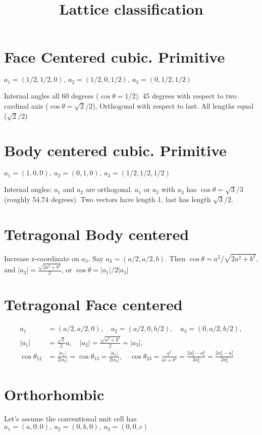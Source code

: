 \documentclass[a4paper,10pt]{article} 	%
\title{Lattice classification}
\author{}
\date{}
\numberwithin{equation}{section}
\begin{document}
	\maketitle

	\section{Face Centered cubic. Primitive}
	$a_1 = (1/2, 1/2, 0),\ a_2 = (1/2, 0, 1/2),\ a_3 = (0, 1/2, 1/2)$
	
	Internal angles all 60 degrees ($\cos \theta = 1/2$). 45 degrees with respect to two cardinal axis ($\cos \theta = \sqrt{2}/2$), Orthogonal with respect to last. All lengths equal ($\sqrt{2}/2$)
	
	\section{Body centered cubic. Primitive}
	$ a_1 = (1,0,0),\ a_2 = (0,1,0),\ a_3 = (1/2,1/2,1/2) $
	
	Internal angles: $a_1$ and $a_2$ are orthogonal. $a_1$ or $a_2$ with $a_3$ has $\cos \theta = \sqrt{3}/3 $ (roughly 54.74 degrees). Two vectors have length 1, last has length $\sqrt{3}/2$.
	
	\section{Tetragonal Body centered}
	Increase z-coordinate on $a_3$. Say $a_3 = (a/2,a/2,b) $. Then $\cos \theta = a^2/\sqrt{2a^2+b^2} $, and $|a_3| = \frac{\sqrt{2a^2+b^2}}{2}$, or $ \cos \theta = |a_1|/2|a_3|$
	
	\section{Tetragonal Face centered}
	\begin{align}
		a_1 &= (a/2,a/2,0), \quad a_2 = (a/2,0,b/2), \quad a_3 = (0,a/2,b/2),\\
		|a_1| &= \frac{\sqrt{2}}{2} a, \quad |a_2| = \frac{\sqrt{a^2+b^2}}{2} = |a_3|, \\
		\cos \theta_{12} & = \frac{|a_1|}{2|a_2|} = \cos \theta_{13} = \frac{|a_1|}{2 |a_3|}, \quad \cos \theta_{23} = \frac{b^2}{a^2+b^2} = \frac{2a_2^2 - a_1^2}{2a_2^2} = \frac{2a_3^2 - a_1^2}{2a_3^2}
	\end{align}
	
	\section{Orthorhombic}
	Let's assume the conventional unit cell has $a_1 = (a,0,0),\ a_2 = (0,b,0),\ a_3 = (0,0,c)$
	
\end{document}
